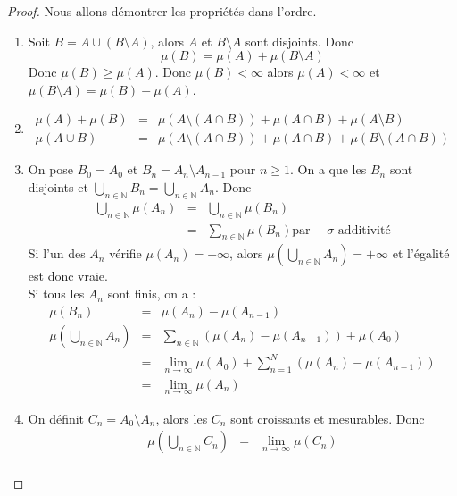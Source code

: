 \begin{proof}
	Nous allons démontrer les propriétés dans l'ordre.
	\begin{enumerate}
		\item Soit $B = A \cup (B \setminus A)$, alors $A$ et $B \setminus A$ sont disjoints. Donc
		      \[\mu(B) = \mu(A) + \mu(B \setminus A)\]
		      Donc $\mu(B) \geq \mu(A)$. Donc $\mu(B) < \infty$ alors $\mu(A)< \infty$ et $\mu(B \setminus A) = \mu(B) - \mu(A)$.
		\item \begin{eqnarray*}
			      \mu(A) + \mu (B) &=& \mu( A \setminus (A \cap B)) + \mu(A \cap B) + \mu(A \setminus B) \\
			      \mu(A\cup B)&=& \mu(A \setminus (A \cap B)) + \mu(A \cap B) + \mu(B \setminus (A \cap B))
		      \end{eqnarray*}
		\item On pose $B_0 = A_0$ et $B_n = A_n \setminus A_{n-1}$ pour $n \geq 1$. On a que les $B_n$ sont disjoints et
		      $\bigcup\limits_{n \in \mathbb{N}} B_n = \bigcup\limits_{n \in \mathbb{N}} A_n$. Donc
		      \begin{eqnarray*}
			      \bigcup\limits_{n \in \mathbb{N}} \mu(A_n) &=& \bigcup\limits_{n \in \mathbb{N}} \mu(B_n) \\
			      &=& \sum\limits_{n \in \mathbb{N}} \mu(B_n) \text{par }\quad \sigma\text{-additivité}
		      \end{eqnarray*}
		      Si l'un des $A_n$ vérifie $\mu(A_n) = +\infty$, alors $\mu(\bigcup\limits_{n \in \mathbb{N}} A_n) = +\infty$
		      et l'égalité est donc vraie.
		      \\
		      Si tous les $A_n$ sont finis, on a :
		      \begin{eqnarray*}
			      \mu(B_n) &=& \mu(A_n) - \mu(A_{n-1}) \\
			      \mu(\bigcup\limits_{n \in \mathbb{N}} A_n) &=& \sum\limits_{n \in \mathbb{N}} \left( \mu(A_n) - \mu(A_{n-1}) \right)+ \mu(A_0) \\
			      &=& \lim\limits_{n \to \infty} \mu(A_0) + \sum\limits_{n = 1}^N \left( \mu(A_n) - \mu(A_{n-1}) \right) \\
			      &=& \lim\limits_{n \to \infty} \mu(A_n)
		      \end{eqnarray*}
		\item On définit $C_n = A_0 \setminus A_n $, alors les $C_n$ sont croissants et mesurables. Donc
		      \begin{eqnarray*}
			      \mu(\bigcup\limits_{n \in \mathbb{N}} C_n) &=& \lim\limits_{n \to \infty} \mu(C_n) \\

\end{eqnarray*}
\end{enumerate}
\end{proof}
